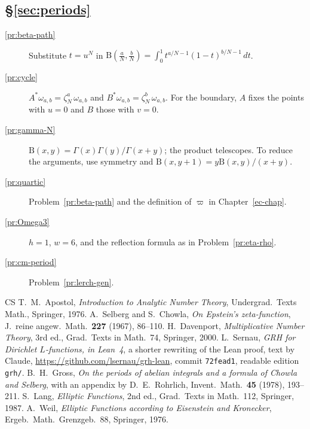 \documentclass[reqno]{amsart}
\newcounter{chap}
\theoremstyle{definition}
\theoremstyle{plain}
\newcommand{\Beta}{\mathrm{B}}
\begin{document}
\subsection*{\S\ref{sec:periods}}
\begin{description}
\item[\ref{pr:beta-path}] Substitute \(t = u^N\) in \(\Beta(\frac aN, \frac bN) = \int_0^1 t^{a/N - 1}(1-t)^{b/N - 1}\, d t\).
\item[\ref{pr:cycle}] \(A^*\omega_{a,b} = \zeta_N^a\, \omega_{a,b}\) and \(B^*\omega_{a,b} = \zeta_N^b\, \omega_{a,b}\).  For the boundary, \(A\) fixes the points with \(u = 0\) and \(B\) those with \(v = 0\).
\item[\ref{pr:gamma-N}] \(\Beta(x, y) = \Gamma(x)\Gamma(y)/\Gamma(x+y)\); the product telescopes.  To reduce the arguments, use symmetry and \(\Beta(x,y+1)=y\Beta(x,y)/(x+y)\).
\item[\ref{pr:quartic}] Problem~\ref{pr:beta-path} and the definition of \(\varpi\) in Chapter~\ref{ec-chap}.
\item[\ref{pr:Omega3}] \(h = 1\), \(w = 6\), and the reflection formula as in Problem~\ref{pr:eta-rho}.
\item[\ref{pr:cm-period}] Problem~\ref{pr:lerch-gen}.
\end{description}

\begin{thebibliography}{CS}
 T.~M.~Apostol, \emph{Introduction to Analytic Number Theory}, Undergrad.\ Texts Math., Springer, 1976.
 A.~Selberg and S.~Chowla, \emph{On Epstein's zeta-function}, J.\ reine angew.\ Math.\ \textbf{227} (1967), 86--110.
 H.~Davenport, \emph{Multiplicative Number Theory}, 3rd ed., Grad.\ Texts in Math.\ 74, Springer, 2000.
 L.~Sernau, \emph{GRH for Dirichlet \(L\)-functions, in Lean~4}, a shorter rewriting of the Lean proof, text by Claude, \url{https://github.com/lsernau/grh-lean}, commit \texttt{72fead1}, readable edition \texttt{grh/}.
 B.~H.~Gross, \emph{On the periods of abelian integrals and a formula of Chowla and Selberg}, with an appendix by D.~E.~Rohrlich, Invent.\ Math.\ \textbf{45} (1978), 193--211.
 S.~Lang, \emph{Elliptic Functions}, 2nd ed., Grad.\ Texts in Math.\ 112, Springer, 1987.
 A.~Weil, \emph{Elliptic Functions according to Eisenstein and Kronecker}, Ergeb.\ Math.\ Grenzgeb.\ 88, Springer, 1976.
\end{thebibliography}
\end{document}
